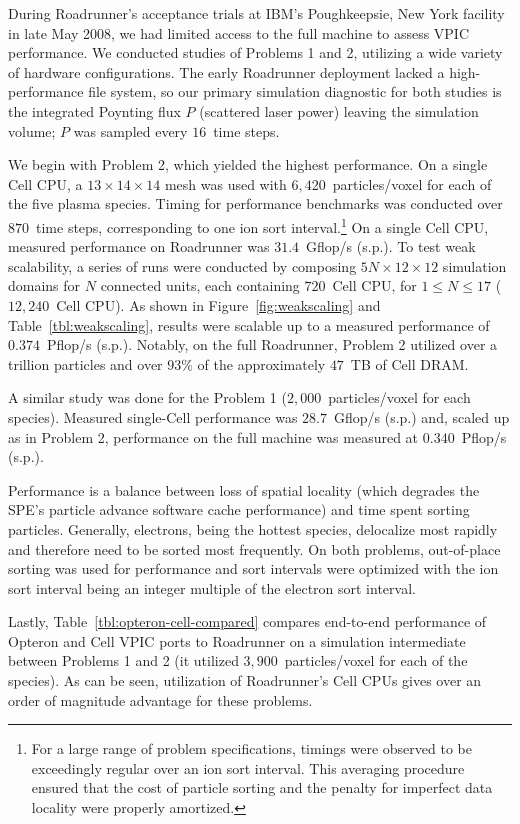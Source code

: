 \documentclass[journal,twoside]{IEEEtran}
\newcommand{\tbl}[1]{Table~\ref{tbl:#1}}
\newcommand{\fig}[1]{Figure~\ref{fig:#1}}
\begin{document}
During Roadrunner's acceptance trials at IBM's Poughkeepsie, New York
facility in late May 2008, we had limited access to the full machine
to assess VPIC performance.  We conducted studies of Problems 1 and 2,
utilizing a wide variety of hardware configurations.  The early
Roadrunner deployment lacked a high-performance file system, so our
primary simulation diagnostic for both studies is the integrated
Poynting flux $P$ (scattered laser power) leaving the simulation
volume; $P$ was sampled every $16$~time steps.

We begin with Problem 2, which yielded the highest performance.  On a
single Cell CPU, a $13 \times 14 \times 14$ mesh was used with
$6,420$~particles/voxel for each of the five plasma species.  Timing
for performance benchmarks was conducted over $870$~time steps,
corresponding to one ion sort interval.\footnote{For a large range of
problem specifications, timings were observed to be exceedingly
regular over an ion sort interval.  This averaging procedure ensured
that the cost of particle sorting and the penalty for imperfect data
locality were properly amortized.}  On a single Cell CPU, measured
performance on Roadrunner was $31.4$~Gflop/s (s.p.).  To test weak
scalability, a series of runs were conducted by composing $5N \times
12 \times 12$ simulation domains for $N$ connected units, each
containing $720$~Cell CPU, for $1 \le N \le 17$ ($12,240$~Cell CPU).
As shown in \fig{weakscaling} and \tbl{weakscaling}, results were
scalable up to a measured performance of $0.374$~Pflop/s (s.p.).
Notably, on the full Roadrunner, Problem 2 utilized over a trillion
particles and over $93\%$ of the approximately $47$~TB of Cell DRAM.

A similar study was done for the Problem 1 ($2,000$~particles/voxel
for each species).  Measured single-Cell performance was
$28.7$~Gflop/s (s.p.) and, scaled up as in Problem 2, performance on
the full machine was measured at $0.340$~Pflop/s (s.p.).

Performance is a balance between loss of spatial locality (which
degrades the SPE's particle advance software cache performance) and
time spent sorting particles.  Generally, electrons, being the hottest
species, delocalize most rapidly and therefore need to be sorted most
frequently.  On both problems, out-of-place sorting was used for
performance and sort intervals were optimized with the ion sort
interval being an integer multiple of the electron sort interval.

Lastly, \tbl{opteron-cell-compared} compares end-to-end performance of
Opteron and Cell VPIC ports to Roadrunner on a simulation intermediate
between Problems 1 and 2 (it utilized $3,900$~particles/voxel for each
of the species).  As can be seen, utilization of Roadrunner's Cell
CPUs gives over an order of magnitude advantage for these problems.
\end{document}
